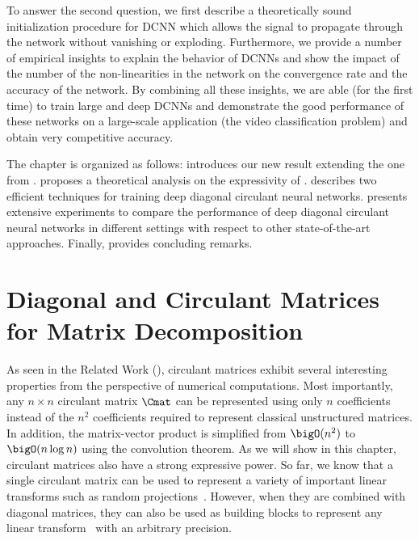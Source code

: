 To answer the second question, we first describe a theoretically sound initialization procedure for DCNN which allows the signal to propagate through the network without vanishing or exploding.
Furthermore, we provide a number of empirical insights to explain the behavior of DCNNs and show the impact of the number of the non-linearities in the network on the convergence rate and the accuracy of the network. 
By combining all these insights, we are able (for the first time) to train large and deep DCNNs and demonstrate the good performance of these networks on a large-scale application (the \yt video classification problem) and obtain very competitive accuracy. 

The chapter is organized as follows:
 introduces our new result extending the one from \citet{huhtanen2015factoring}.
 proposes a theoretical analysis on the expressivity of \dcnns.
 describes two efficient techniques for training deep diagonal circulant neural networks.
 presents extensive experiments to compare the performance of deep diagonal circulant neural networks in different settings with respect to other state-of-the-art approaches.
Finally,  provides concluding remarks. 




\section{Diagonal and Circulant Matrices for Matrix Decomposition}
\label{section:ch4-diagonal_and_circulant_matrices_for_matrix_decomposition}

As seen in the Related Work (), circulant matrices exhibit several interesting properties from the perspective of numerical computations.
Most importantly, any $n \times n$ circulant matrix $\Cmat$ can be represented using only $n$ coefficients instead of the $n^2$ coefficients required to represent classical unstructured matrices.
In addition, the matrix-vector product is simplified from $\bigO(n^2)$ to $\bigO(n \log n)$ using the  convolution theorem.
As we will show in this chapter, circulant matrices also have a strong expressive power.
So far, we know that a single circulant matrix can be used to represent a variety of important linear transforms such as random projections~\cite{hinrichs2011johnson}. 
However, when they are combined with diagonal matrices, they can also be used as building blocks to represent any linear transform~\cite{schmid2000decomposing,huhtanen2015factoring} with an arbitrary precision.

